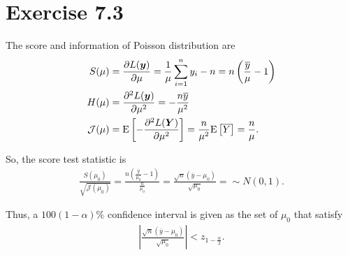 \section*{Exercise 7.3}
The score and information of Poisson distribution are
\begin{align*}
S(\mu) &= \frac{\partial L(\bm{y})}{\partial \mu} = \frac{1}{\mu}\sum_{i=1}^{n}y_{i} -n = n\left(\frac{\overline{y}}{\mu}-1\right)\\
H(\mu) &= \frac{\partial^{2} L(\bm{y})}{\partial \mu^{2}} = -\frac{n\overline{y}}{\mu^{2}}\\
\mathcal{J}(\mu) &= \mathrm{E}\left[-\frac{\partial^{2} L(\bm{Y})}{\partial \mu^{2}}\right] = \frac{n}{\mu^{2}}\mathrm{E}\left[\overline{Y}\right] = \frac{n}{\mu}.
\end{align*}

So, the score test statistic is
\begin{align*}
\frac{S(\mu_{0})}{\sqrt{\mathcal{J}(\mu_{0})}} = \frac{n\left(\frac{\overline{y}}{\mu_{0}}-1\right)}{\frac{n}{\mu_{0}}} = \frac{\sqrt{n}(\overline{y}-\mu_{0})}{\sqrt{\mu_{0}}} = \sim N(0,1).
\end{align*}

Thus, a $100(1-\alpha)\%$ confidence interval is given as the set of $\mu_{0}$ that satisfy
\begin{align*}
\left|\frac{\sqrt{n}(\overline{y}-\mu_{0})}{\sqrt{\mu_{0}}}\right| < z_{1-\frac{\alpha}{2}}.
\end{align*}